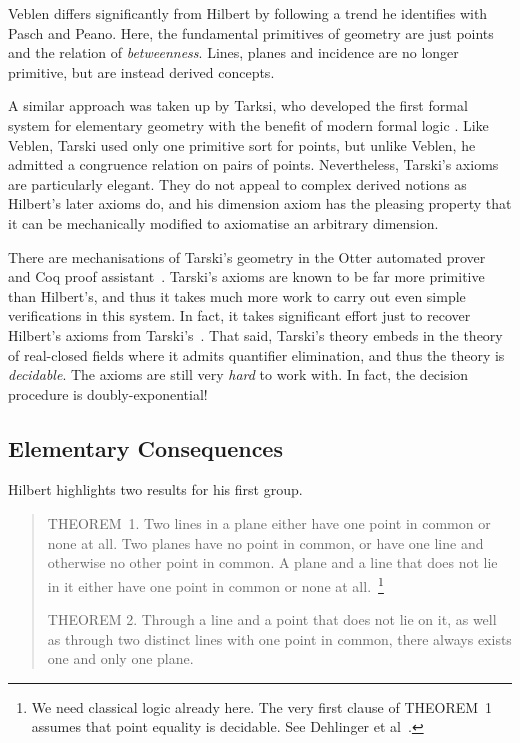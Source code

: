 Veblen differs significantly from Hilbert by following a trend he identifies with Pasch and Peano. Here, the fundamental primitives of geometry are just points and the relation of \emph{betweenness}. Lines, planes and incidence are no longer primitive, but are instead derived concepts.

A similar approach was taken up by Tarksi, who developed the first formal system for elementary geometry with the benefit of modern formal logic \cite{TarskiGeometrySystem}. Like Veblen, Tarski used only one primitive sort for points, but unlike Veblen, he admitted a congruence relation on pairs of points. Nevertheless, Tarski's axioms are particularly elegant. They do not appeal to complex derived notions as Hilbert's later axioms do, and his dimension axiom has the pleasing property that it can be mechanically modified to axiomatise an arbitrary dimension.

There are mechanisations of Tarski's geometry in the Otter automated prover~\cite{QuaifeTarski} and Coq proof assistant~\cite{NarbouxTarski}. Tarski's axioms are known to be far more primitive than Hilbert's, and thus it takes much more work to carry out even simple verifications in this system. In fact, it takes significant effort just to recover Hilbert's axioms from Tarski's~\cite{NarbouxTarskiHilbert}. That said, Tarski's theory embeds in the theory of real-closed fields where it admits quantifier elimination, and thus the theory is \emph{decidable}. The axioms are still very \emph{hard} to work with. In fact, the decision procedure is doubly-exponential!

\subsection{Elementary Consequences}
Hilbert highlights two results for his first group.

\begin{quotation}
  THEOREM~1. Two lines in a plane either have one point in common or none at all. Two planes have no point in common, or have one line and otherwise no other point in common. A plane and a line that does not lie in it either have one point in common or none at all.~\footnote{We need classical logic already here. The very first clause of THEOREM~1 assumes that point equality is decidable. See Dehlinger et al~\cite{DehlingerFOG}.}

  THEOREM 2. Through a line and a point that does not lie on it, as well as through two distinct lines with one point in common, there always exists one and only one plane.
\end{quotation}

